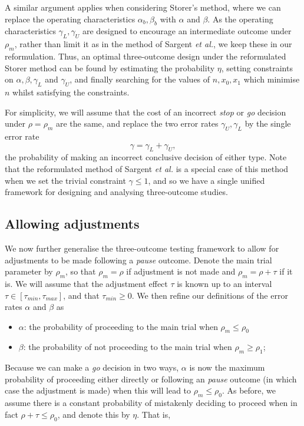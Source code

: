 \documentclass{bmcart}
\begin{document}
A similar argument applies when considering Storer's method, where we can replace the operating characteristics $\alpha_b, \beta_b$ with $\alpha$ and $\beta$. As the operating characteristics $\gamma_L, \gamma_U$ are designed to encourage an intermediate outcome under $\rho_m$, rather than limit it as in the method of Sargent \emph{et al.}, we keep these in our reformulation. Thus, an optimal three-outcome design under the reformulated Storer method can be found by estimating the probability $\eta$, setting constraints on $\alpha, \beta, \gamma_L$ and $\gamma_U$, and finally searching for the values of  $n, x_0, x_1$ which minimise $n$ whilst satisfying the constraints. 

For simplicity, we will assume that the cost of an incorrect \emph{stop} or \emph{go} decision under $\rho = \rho_m$ are the same, and replace the two error rates $\gamma_U, \gamma_L$ by the single error rate
$$
\gamma = \gamma_L + \gamma_U,
$$
the probability of making an incorrect conclusive decision of either type. Note that the reformulated method of Sargent \emph{et al.} is a special case of this method when we set the trivial constraint $\gamma \leq 1$, and so we have a single unified framework for designing and analysing three-outcome studies.

\subsection{Allowing adjustments}

We now further generalise the three-outcome testing framework to allow for adjustments to be made following a \emph{pause} outcome. Denote the main trial parameter by $\rho_m$, so that $\rho_m = \rho$ if adjustment is not made and $\rho_m  = \rho + \tau$ if it is. We will assume that the adjustment effect $\tau$ is known up to an interval $\tau \in [\tau_{min}, \tau_{max}]$, and that $\tau_{min} \geq 0$. We then refine our definitions of the error rates $\alpha$ and $\beta$ as

\begin{itemize}
\item $\alpha$: the probability of proceeding to the main trial when $\rho_m \leq \rho_0$
\item $\beta$: the probability of not proceeding to the main trial when $\rho_m \geq \rho_1$;
\end{itemize}

Because we can make a \emph{go} decision in two ways, $\alpha$ is now the maximum probability of proceeding either directly or following an \emph{pause} outcome (in which case the adjustment is made) when this will lead to $\rho_m \leq \rho_0$. As before, we assume there is a constant probability of mistakenly deciding to proceed when in fact $\rho + \tau \leq \rho_0$, and denote this by $\eta$. That is,
\end{document}
